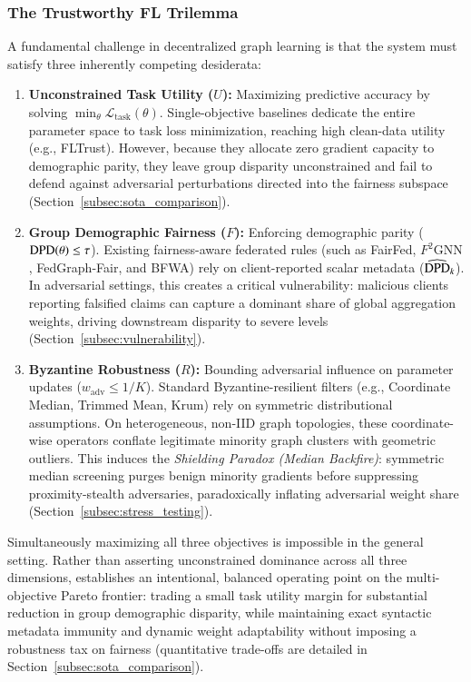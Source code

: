 \subsubsection{The Trustworthy FL Trilemma}
A fundamental challenge in decentralized graph learning is that the system must satisfy three inherently competing desiderata:
\begin{enumerate}[leftmargin=*]
    \item \textbf{Unconstrained Task Utility ($U$):} Maximizing predictive accuracy by solving $\min_\theta \mathcal{L}_{\mathrm{task}}(\theta)$. Single-objective baselines dedicate the entire parameter space to task loss minimization, reaching high clean-data utility (e.g., FLTrust). However, because they allocate zero gradient capacity to demographic parity, they leave group disparity unconstrained and fail to defend against adversarial perturbations directed into the fairness subspace (Section~\ref{subsec:sota_comparison}).
    \item \textbf{Group Demographic Fairness ($F$):} Enforcing demographic parity ($\mathrm{DPD}(\theta) \le \tau$). Existing fairness-aware federated rules (such as FairFed, $F^2\text{GNN}$, FedGraph-Fair, and BFWA) rely on client-reported scalar metadata ($\widehat{\mathrm{DPD}}_k$). In adversarial settings, this creates a critical vulnerability: malicious clients reporting falsified claims can capture a dominant share of global aggregation weights, driving downstream disparity to severe levels (Section~\ref{subsec:vulnerability}).
    \item \textbf{Byzantine Robustness ($R$):} Bounding adversarial influence on parameter updates ($w_{\mathrm{adv}} \le 1/K$). Standard Byzantine-resilient filters (e.g., Coordinate Median, Trimmed Mean, Krum) rely on symmetric distributional assumptions. On heterogeneous, non-IID graph topologies, these coordinate-wise operators conflate legitimate minority graph clusters with geometric outliers. This induces the \emph{Shielding Paradox (Median Backfire)}: symmetric median screening purges benign minority gradients before suppressing proximity-stealth adversaries, paradoxically inflating adversarial weight share (Section~\ref{subsec:stress_testing}).
\end{enumerate}

\begin{remark}
Simultaneously maximizing all three objectives is impossible in the general setting. Rather than asserting unconstrained dominance across all three dimensions, \MethodName{} establishes an intentional, balanced operating point on the multi-objective Pareto frontier: trading a small task utility margin for substantial reduction in group demographic disparity, while maintaining exact syntactic metadata immunity and dynamic weight adaptability without imposing a robustness tax on fairness (quantitative trade-offs are detailed in Section~\ref{subsec:sota_comparison}).
\end{remark}

